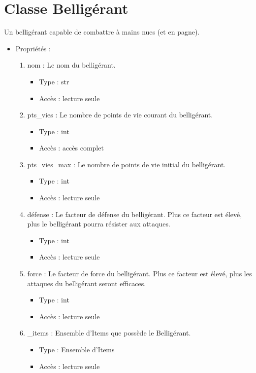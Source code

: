 \documentclass[12pt,pdftex,oneside]{article}
\begin{document}
  \section {Classe Belligérant}

  Un belligérant capable de combattre à mains nues (et en pagne).

  \begin{itemize}
  \item Propriétés : 
    \begin{enumerate}
    \item nom : Le nom du belligérant.
          \begin{itemize}
          \item Type : str
          \item Accès : lecture seule
          \end{itemize}
    \item pts\_vies : Le nombre de points de vie courant du belligérant.
          \begin{itemize}
          \item Type : int
          \item Accès : accès complet
          \end{itemize}
    \item pts\_vies\_max : Le nombre de points de vie initial du belligérant.
          \begin{itemize}
          \item Type : int
          \item Accès : lecture seule
          \end{itemize}
    \item défense : Le facteur de défense du belligérant. Plus ce facteur est
      élevé, plus le belligérant pourra résister aux attaques.
          \begin{itemize}
          \item Type : int
          \item Accès : lecture seule
          \end{itemize}
    \item force : Le facteur de force du belligérant. Plus ce facteur est
      élevé, plus les attaques du belligérant seront efficaces.
          \begin{itemize}
          \item Type : int
          \item Accès : lecture seule
          \end{itemize}
    \item \_items : Ensemble d'Items que possède le Belligérant.
          \begin{itemize}
          \item Type : Ensemble d'Items
          \item Accès : lecture seule
          \end{itemize}


\end{enumerate}
\end{itemize}
\end{document}
